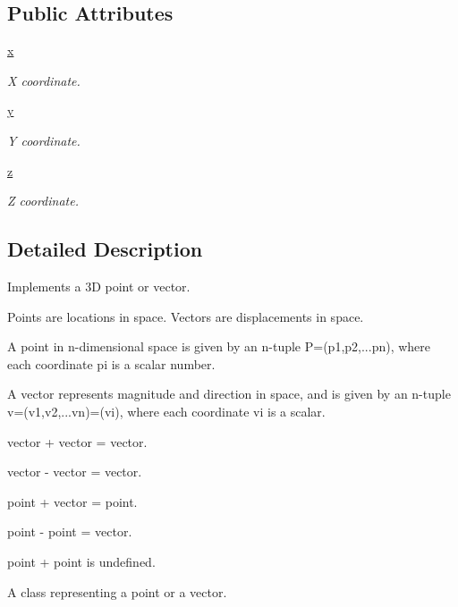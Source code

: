 \subsection*{Public Attributes}
\begin{DoxyCompactItemize}
\item 
\mbox{\label{classgeometry_1_1Point_a98f21eef44d1c182f04f1262c90815fc}} 
\hyperlink{classgeometry_1_1Point_a98f21eef44d1c182f04f1262c90815fc}{x}
\begin{DoxyCompactList}\small\item\em X coordinate. \end{DoxyCompactList}\item 
\mbox{\label{classgeometry_1_1Point_a4ef9a436e11219296ba5e3fff9e87711}} 
\hyperlink{classgeometry_1_1Point_a4ef9a436e11219296ba5e3fff9e87711}{y}
\begin{DoxyCompactList}\small\item\em Y coordinate. \end{DoxyCompactList}\item 
\mbox{\label{classgeometry_1_1Point_afd1ce6427fa3e28c9c42934bb5d76165}} 
\hyperlink{classgeometry_1_1Point_afd1ce6427fa3e28c9c42934bb5d76165}{z}
\begin{DoxyCompactList}\small\item\em Z coordinate. \end{DoxyCompactList}\end{DoxyCompactItemize}


\subsection{Detailed Description}
Implements a 3D point or vector. 

Points are locations in space. Vectors are displacements in space.

A point in n-\/dimensional space is given by an n-\/tuple P=(p1,p2,...pn), where each coordinate pi is a scalar number.

A vector represents magnitude and direction in space, and is given by an n-\/tuple v=(v1,v2,...vn)=(vi), where each coordinate vi is a scalar.


\begin{DoxyItemize}
\item vector + vector = vector.
\item vector -\/ vector = vector.
\item point + vector = point.
\item point -\/ point = vector.
\item point + point is undefined.\begin{DoxyVerb}A class representing a point or a vector.\end{DoxyVerb}
 
\end{DoxyItemize}

